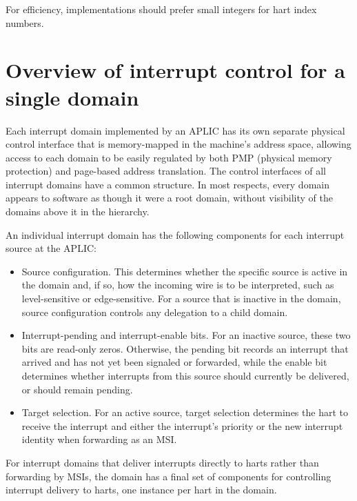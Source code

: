 \begin{commentary}
For efficiency, implementations should prefer small integers for hart
index numbers.
\end{commentary}

\section{Overview of interrupt control for a single domain}

Each interrupt domain implemented by an APLIC has its own separate
physical control interface that is memory-mapped in the machine's
address space, allowing access to each domain to be easily regulated
by both PMP (physical memory protection) and page-based address
translation.
The control interfaces of all interrupt domains have a common
structure.
In most respects, every domain appears to software as though it were
a root domain, without visibility of the domains above it in the
hierarchy.

An individual interrupt domain has the following components for each
interrupt source at the APLIC:
\begin{itemize}

\item
Source configuration.
This determines whether the specific source is active in the domain
and, if so, how the incoming wire is to be interpreted, such as
level-sensitive or edge-sensitive.
For a source that is inactive in the domain, source configuration
controls any delegation to a child domain.

\item
Interrupt-pending and interrupt-enable bits.
For an inactive source, these two bits are read-only zeros.
Otherwise, the pending bit records an interrupt that arrived and has
not yet been signaled or forwarded, while the enable bit determines
whether interrupts from this source should currently be delivered, or
should remain pending.

\item
Target selection.
For an active source, target selection determines the hart to receive
the interrupt and either the interrupt's priority or the new interrupt
identity when forwarding as an MSI.

\end{itemize}

For interrupt domains that deliver interrupts directly to harts rather
than forwarding by MSIs, the domain has a final set of components for
controlling interrupt delivery to harts, one instance per hart in the
domain.


